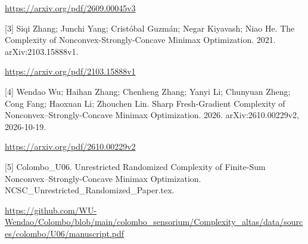 \documentclass[10pt,a4paper]{article}
\begin{document}
\url{https://arxiv.org/pdf/2609.00045v3}



[3] Siqi Zhang; Junchi Yang; Cristóbal Guzmán; Negar Kiyavash; Niao He. The Complexity of Nonconvex-Strongly-Concave Minimax Optimization. 2021. arXiv:2103.15888v1.



\url{https://arxiv.org/pdf/2103.15888v1}



[4] Wendao Wu; Haihan Zhang; Chenheng Zhang; Yanyi Li; Chunyuan Zheng; Cong Fang; Haoxuan Li; Zhouchen Lin. Sharp Fresh-Gradient Complexity of Nonconvex--Strongly-Concave Minimax Optimization. 2026. arXiv:2610.00229v2, 2026-10-19.



\url{https://arxiv.org/pdf/2610.00229v2}



[5] Colombo\_U06. Unrestricted Randomized Complexity of Finite-Sum Nonconvex--Strongly-Concave Minimax Optimization. NCSC\_Unrestricted\_Randomized\_Paper.tex.



\url{https://github.com/WU-Wendao/Colombo/blob/main/colombo_sensorium/Complexity_altas/data/sources/colombo/U06/manuscript.pdf}
\end{document}
